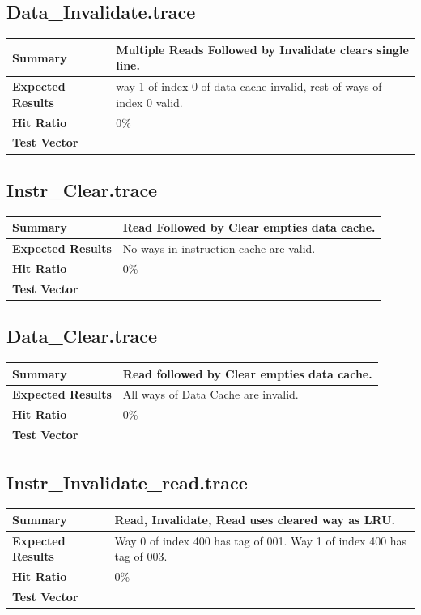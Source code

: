 \documentclass{article}
\begin{document}
\subsection{Data\_Invalidate.trace}
\begin{tabular}{|p{1.2in}|p{3.8in}|}
  \hline
  \textbf{Summary} & Multiple Reads Followed by Invalidate clears single line.\\
  \hline
  \textbf{Expected Results} & way 1 of index 0 of data cache invalid, rest of ways of index 0 valid.\\
  \hline
  \textbf{Hit Ratio} & 0\%\\
  \hline
  \textbf{Test Vector} &  \\
  \hline
\end{tabular}

\subsection{Instr\_Clear.trace}
\begin{tabular}{|p{1.2in}|p{3.8in}|}
  \hline
  \textbf{Summary} & Read Followed by Clear empties data cache.\\
  \hline
  \textbf{Expected Results} & No ways in instruction cache are valid.\\
  \hline
  \textbf{Hit Ratio} & 0\%\\
  \hline
  \textbf{Test Vector} &  \\
  \hline
\end{tabular}

\subsection{Data\_Clear.trace}
\begin{tabular}{|p{1.2in}|p{3.8in}|}
  \hline
  \textbf{Summary} & Read followed by Clear empties data cache.\\
  \hline
  \textbf{Expected Results} & All ways of Data Cache are invalid.\\
  \hline
  \textbf{Hit Ratio} & 0\%\\
  \hline
  \textbf{Test Vector} &  \\
  \hline
\end{tabular}

\subsection{Instr\_Invalidate\_read.trace}
\begin{tabular}{|p{1.2in}|p{3.8in}|}
  \hline
  \textbf{Summary} & Read, Invalidate, Read uses cleared way as LRU.\\
  \hline
  \textbf{Expected Results} & Way 0 of index 400 has tag of 001. Way 1 of index
                  400 has tag of 003.\\
  \hline
  \textbf{Hit Ratio} & 0\%\\
  \hline
  \textbf{Test Vector} &  \\
  \hline
\end{tabular}
\end{document}
